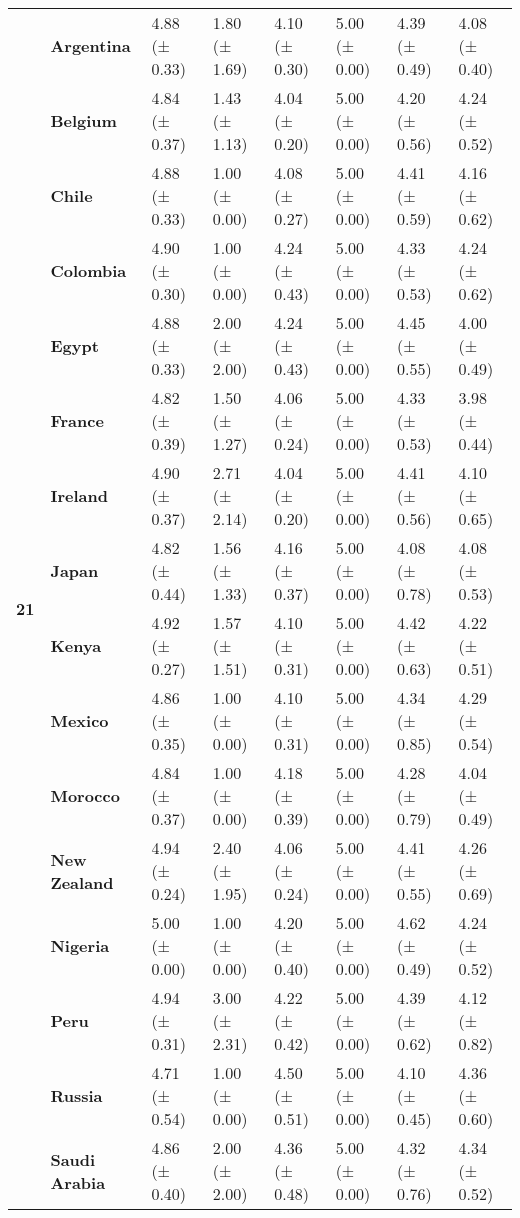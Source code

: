 \begin{longtable}{llllllll}
\cline{1-8}
\multirow[t]{19}{*}{\textbf{21}} & \textbf{Argentina} & 4.88 (± 0.33) & 1.80 (± 1.69) & 4.10 (± 0.30) & 5.00 (± 0.00) & 4.39 (± 0.49) & 4.08 (± 0.40) \\
\textbf{} & \textbf{Belgium} & 4.84 (± 0.37) & 1.43 (± 1.13) & 4.04 (± 0.20) & 5.00 (± 0.00) & 4.20 (± 0.56) & 4.24 (± 0.52) \\
\textbf{} & \textbf{Chile} & 4.88 (± 0.33) & 1.00 (± 0.00) & 4.08 (± 0.27) & 5.00 (± 0.00) & 4.41 (± 0.59) & 4.16 (± 0.62) \\
\textbf{} & \textbf{Colombia} & 4.90 (± 0.30) & 1.00 (± 0.00) & 4.24 (± 0.43) & 5.00 (± 0.00) & 4.33 (± 0.53) & 4.24 (± 0.62) \\
\textbf{} & \textbf{Egypt} & 4.88 (± 0.33) & 2.00 (± 2.00) & 4.24 (± 0.43) & 5.00 (± 0.00) & 4.45 (± 0.55) & 4.00 (± 0.49) \\
\textbf{} & \textbf{France} & 4.82 (± 0.39) & 1.50 (± 1.27) & 4.06 (± 0.24) & 5.00 (± 0.00) & 4.33 (± 0.53) & 3.98 (± 0.44) \\
\textbf{} & \textbf{Ireland} & 4.90 (± 0.37) & 2.71 (± 2.14) & 4.04 (± 0.20) & 5.00 (± 0.00) & 4.41 (± 0.56) & 4.10 (± 0.65) \\
\textbf{} & \textbf{Japan} & 4.82 (± 0.44) & 1.56 (± 1.33) & 4.16 (± 0.37) & 5.00 (± 0.00) & 4.08 (± 0.78) & 4.08 (± 0.53) \\
\textbf{} & \textbf{Kenya} & 4.92 (± 0.27) & 1.57 (± 1.51) & 4.10 (± 0.31) & 5.00 (± 0.00) & 4.42 (± 0.63) & 4.22 (± 0.51) \\
\textbf{} & \textbf{Mexico} & 4.86 (± 0.35) & 1.00 (± 0.00) & 4.10 (± 0.31) & 5.00 (± 0.00) & 4.34 (± 0.85) & 4.29 (± 0.54) \\
\textbf{} & \textbf{Morocco} & 4.84 (± 0.37) & 1.00 (± 0.00) & 4.18 (± 0.39) & 5.00 (± 0.00) & 4.28 (± 0.79) & 4.04 (± 0.49) \\
\textbf{} & \textbf{New Zealand} & 4.94 (± 0.24) & 2.40 (± 1.95) & 4.06 (± 0.24) & 5.00 (± 0.00) & 4.41 (± 0.55) & 4.26 (± 0.69) \\
\textbf{} & \textbf{Nigeria} & 5.00 (± 0.00) & 1.00 (± 0.00) & 4.20 (± 0.40) & 5.00 (± 0.00) & 4.62 (± 0.49) & 4.24 (± 0.52) \\
\textbf{} & \textbf{Peru} & 4.94 (± 0.31) & 3.00 (± 2.31) & 4.22 (± 0.42) & 5.00 (± 0.00) & 4.39 (± 0.62) & 4.12 (± 0.82) \\
\textbf{} & \textbf{Russia} & 4.71 (± 0.54) & 1.00 (± 0.00) & 4.50 (± 0.51) & 5.00 (± 0.00) & 4.10 (± 0.45) & 4.36 (± 0.60) \\
\textbf{} & \textbf{Saudi Arabia} & 4.86 (± 0.40) & 2.00 (± 2.00) & 4.36 (± 0.48) & 5.00 (± 0.00) & 4.32 (± 0.76) & 4.34 (± 0.52) \\

\end{longtable}
